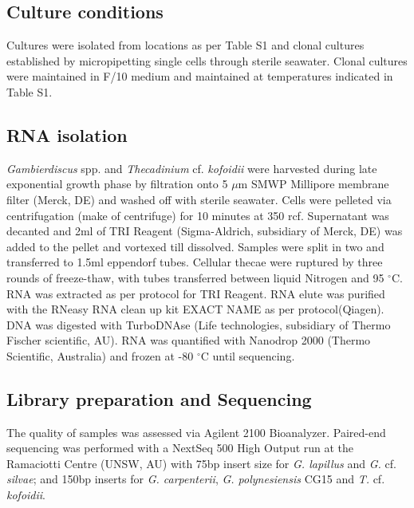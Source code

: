 \documentclass[12pt]{article}
\begin{document}
\subsection*{Culture conditions}
\FloatBarrier
Cultures were isolated from locations as per Table S1 and clonal cultures established by micropipetting single cells through sterile seawater. 
Clonal cultures were maintained in F/10 medium and maintained at temperatures indicated in Table S1. 

\subsection*{RNA isolation}
\emph{Gambierdiscus} spp. and \emph{Thecadinium} cf. \emph{kofoidii} were harvested during late exponential growth phase by filtration onto 5 $\mu$m SMWP Millipore membrane filter (Merck, DE) and washed off with sterile seawater. 
Cells were pelleted via centrifugation (make of centrifuge) for 10 minutes at 350 rcf. 
Supernatant was decanted and 2ml of TRI Reagent (Sigma-Aldrich, subsidiary of Merck, DE) was added to the pellet and vortexed till dissolved. 
Samples were split in two and transferred to 1.5ml eppendorf tubes. 
Cellular thecae were ruptured by three rounds of freeze-thaw, with tubes transferred between liquid Nitrogen and 95 $^{\circ}$C. 
RNA was extracted as per protocol for TRI Reagent. 
RNA elute was purified with the RNeasy RNA clean up kit EXACT NAME as per protocol(Qiagen). 
DNA was digested with TurboDNAse (Life technologies, subsidiary of Thermo Fischer scientific, AU). 
RNA was quantified with Nanodrop 2000 (Thermo Scientific, Australia) and frozen at -80 $^{\circ}$C until sequencing.
 
\subsection*{Library preparation and Sequencing}
The quality of samples was assessed via Agilent 2100 Bioanalyzer. 
Paired-end sequencing was performed with a NextSeq 500 High Output run at the Ramaciotti Centre (UNSW, AU) with 75bp insert size for \emph{G. lapillus} and \emph{G.} cf. \emph{silvae}; and 150bp inserts for \emph{G. carpenterii}, \emph{G. polynesiensis} CG15 and \emph{T.} cf. \emph{kofoidii}.
\end{document}

